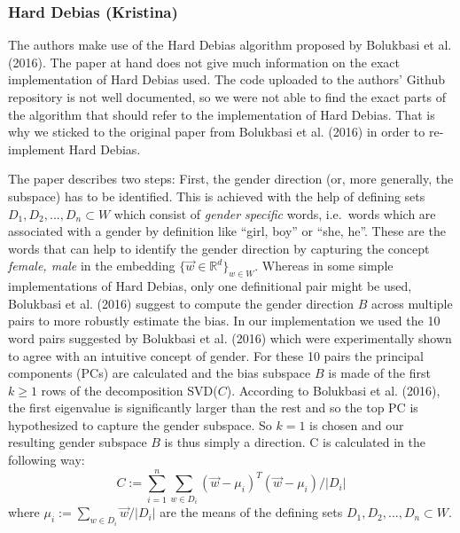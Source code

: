 \documentclass[
  english,
  man,floatsintext]{apa6}
\begin{document}
\hypertarget{hard-debias-kristina}{%
\subsubsection{Hard Debias (Kristina)}\label{hard-debias-kristina}}

The authors make use of the Hard Debias algorithm proposed by Bolukbasi et al. (2016). The paper at hand does not give much information on the exact implementation of Hard Debias used. The code uploaded to the authors' Github repository is not well documented, so we were not able to find the exact parts of the algorithm that should refer to the implementation of Hard Debias. That is why we sticked to the original paper from Bolukbasi et al. (2016) in order to re-implement Hard Debias.

The paper describes two steps: First, the gender direction (or, more generally, the subspace) has to be identified. This is achieved with the help of defining sets \(D_1, D_2, ..., D_n \subset W\) which consist of \emph{gender specific} words, i.e.~words which are associated with a gender by definition like \enquote{girl, boy} or \enquote{she, he}. These are the words that can help to identify the gender direction by capturing the concept \emph{female, male} in the embedding \(\{\vec{w}\in\mathbb{R}^d\}_{w\in W}\). Whereas in some simple implementations of Hard Debias, only one definitional pair might be used, Bolukbasi et al. (2016) suggest to compute the gender direction \(B\) across multiple pairs to more robustly estimate the bias. In our implementation we used the 10 word pairs suggested by Bolukbasi et al. (2016) which were experimentally shown to agree with an intuitive concept of gender. For these 10 pairs the principal components (PCs) are calculated and the bias subspace \(B\) is made of the first \(k \geq 1\) rows of the decomposition SVD(\(C\)). According to Bolukbasi et al. (2016), the first eigenvalue is significantly larger than the rest and so the top PC is hypothesized to capture the gender subspace. So \(k=1\) is chosen and our resulting gender subspace \(B\) is thus simply a direction. C is calculated in the following way: \[C:=\sum_{i=1}^n \sum_{w\in D_i}(\vec{w}-\mu_i)^T(\vec{w}-\mu_i)/|D_i|\] where \(\mu_i := \sum_{w\in D_i}\vec{w}/|D_i|\) are the means of the defining sets \(D_1, D_2, ..., D_n \subset W\).
\end{document}
